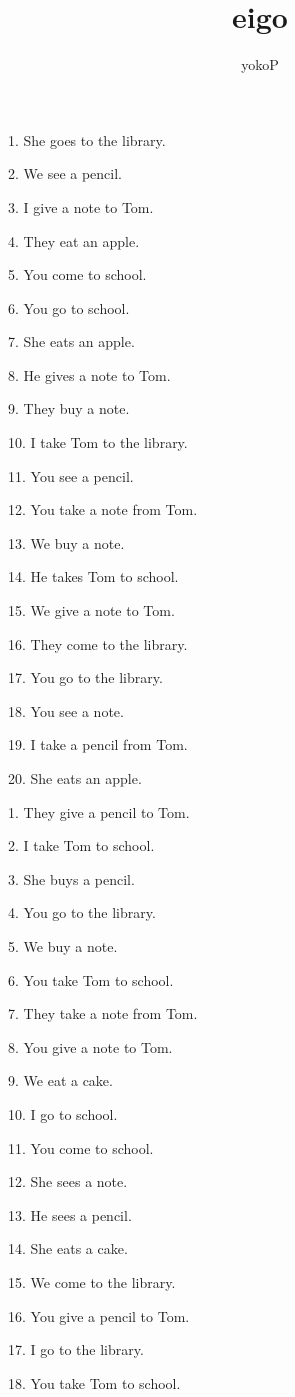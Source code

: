 \documentclass[uplatex,
paper=a4,
fontsize=18pt,
jafontsize=16pt,
number_of_lines=30,
line_length=30zh,
baselineskip=25pt,
]{jlreq}
\author{yokoP}
\title{eigo}
\begin{document}
1.  She goes to the library.

2.  We see a pencil.

3.  I give a note to Tom.

4.  They eat an apple.

5.  You come to school.

6.  You go to school.

7.  She eats an apple.

8.  He gives a note to Tom.

9.  They buy a note.

10.  I take Tom to the library.

11.  You see a pencil.

12.  You take a note from Tom.

13.  We buy a note.

14.  He takes Tom to school.

15.  We give a note to Tom.

16.  They come to the library.

17.  You go to the library.

18.  You see a note.

19.  I take a pencil from Tom.

20.  She eats an apple.


\newpage
{}
1.  They give a pencil to Tom.

2.  I take Tom to school.

3.  She buys a pencil.

4.  You go to the library.

5.  We buy a note.

6.  You take Tom to school.

7.  They take a note from Tom.

8.  You give a note to Tom.

9.  We eat a cake.

10.  I go to school.

11.  You come to school.

12.  She sees a note.

13.  He sees a pencil.

14.  She eats a cake.

15.  We come to the library.

16.  You give a pencil to Tom.

17.  I go to the library.

18.  You take Tom to school.
\end{document}
